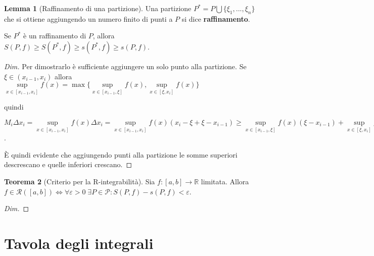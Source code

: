 \documentclass{article}
\theoremstyle{definition}
\newtheorem{theorem}{Teorema}[section]
\theoremstyle{definition}
\newtheorem{lemma}[theorem]{Lemma}
\theoremstyle{definition}
\theoremstyle{definition}
\theoremstyle{definition}
\begin{document}
\begin{lemma}[Raffinamento di una partizione]
    Una partizione $P^*=P \bigcup \lbrace\xi_1,...,\xi_n \rbrace$ che si ottiene aggiungendo un numero finito di punti a $P$ si dice \textbf{raffinamento}.
    
    Se $P^*$ è un raffinamento di $P$, allora $S(P,f) \geq S(P^*,f) \geq s(P^*,f) \geq s(P,f)$.
    \begin{proof}[Dim]
        Per dimostrarlo è sufficiente aggiungere un solo punto alla partizione. Se $\xi \in (x_{i-1},x_i)$ allora $\underset{x \in [x_{i-1},x_i]}{\sup} f(x) = \max \lbrace \underset{x \in [x_{i-1},\xi]}{\sup} f(x), \underset{x \in [\xi,x_i]}{\sup} f(x) \rbrace$

        \vspace{3mm}

        quindi

        \vspace{2mm}

        $M_i \Delta x_i = \underset{x \in [x_{i-1},x_i]}{\sup} f(x) \Delta x_i = \underset{x \in [x_{i-1},x_i]}{\sup} f(x)(x_i -\xi + \xi - x_{i-1}) \geq \underset{x \in [x_{i-1},\xi]}{\sup} f(x)(\xi-x_{i-1}) + \underset{x \in [\xi,x_i]}{\sup} f(x)(x_i- \xi)$.

        È quindi evidente che aggiungendo punti alla partizione le somme superiori descrescano e quelle inferiori crescano.
    \end{proof}
\end{lemma}

\begin{theorem}[Criterio per la R-integrabilità]
    Sia $f:[a,b]\rightarrow \mathbb{R}$ limitata. Allora $f\in\mathcal{R}([a,b]) \Leftrightarrow \forall\varepsilon >0 \; \exists P\in\mathcal{P}: S(P,f)-s(P,f)<\varepsilon$.
    \begin{proof}[Dim]
        
    \end{proof}
\end{theorem}






\newpage
\section{Tavola degli integrali}
\end{document}
